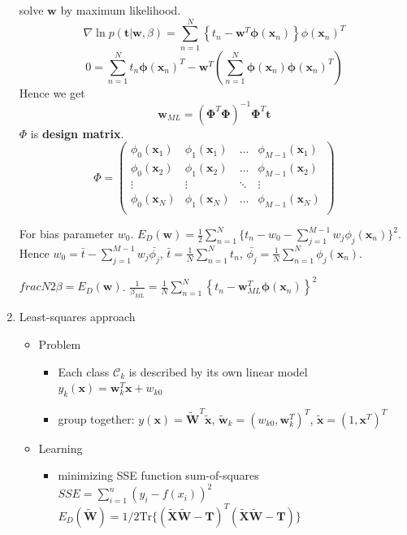 \documentclass[11pt]{article}
\newcommand{\bl}[1] {\boldsymbol{#1}}
\begin{document}
\begin{enumerate}
solve \(\bl{w}\) by maximum likelihood.
\begin{equation*}
\nabla\ln p(\bl{t}|\bl{w},\beta)=\displaystyle\sum_{n=1}^N
\left\{t_n-\bl{w}^T\bl{\phi}(\bl{x}_n)\right\}\phi(\bl{x}_n)^T
\end{equation*}
\begin{equation*}
0=\displaystyle\sum_{n=1}^N t_n\bl{\phi}(\bl{x}_n)^T-\bl{w}^T
(\displaystyle\sum_{n=1}^N\bl{\phi}(\bl{x}_n)\bl{\phi}(\bl{x}_n)^T)
\end{equation*}
Hence we get
\begin{equation*}
\bl{w}_{ML}=(\bl{\Phi}^T\bl{\Phi})^{-1}\bl{\Phi}^T\bl{t}
\end{equation*}
\(\Phi\) is \textbf{design matrix}.
\[
\Phi=\begin{pmatrix}
 \phi_0(\bl{x}_1) & \phi_1(\bl{x}_1) & \dots & \phi_{M-1}(\bl{x}_1) \\
 \phi_0(\bl{x}_2) & \phi_1(\bl{x}_2) & \dots & \phi_{M-1}(\bl{x}_2) \\
 \vdots & \vdots & \ddots & \vdots \\
 \phi_0(\bl{x}_N) & \phi_1(\bl{x}_N) & \dots & \phi_{M-1}(\bl{x}_N) \\
\end{pmatrix}
\]

For bias parameter \(w_0\).
\(E_D(\bl{w})=\frac{1}{2}\displaystyle\sum_{n=1}^N 
     \{t_n-w_0-\displaystyle\sum_{j=1}^{M-1}w_j\phi_j(\bl{x}_n)\}^2\). Hence
\(w_0=\bar{t}-\displaystyle\sum_{j=1}^{M-1}w_j\bar{\phi_j}\),
\(\bar{t}=\frac{1}{N}\displaystyle\sum_{n=1}^Nt_n\),
\(\bar{\phi_j}=\frac{1}{N}\displaystyle\sum_{n=1}^N\phi_j(\bl{x}_n)\).

\(frac{N}{2\beta}=E_D(\bl{w})\). \(\frac{1}{\beta_{ML}}=
     \frac{1}{N}\displaystyle\sum_{n=1}^N\left\{t_n-\bl{w}^T_{ML}
     \bl{\phi}(\bl{x}_n)\right\}^2\)
\item Least-squares approach
\label{sec:org3a414e4}
\begin{itemize}
\item Problem
\begin{itemize}
\item Each class \(\mathcal{C}_k\) is described by its own linear model 
\(y_k(\bl{x})=\bl{w}_k^T\bl{x}+w_{k0}\)
\item group together: \(y(\bl{x})=\widetilde{\bl{W}}^T\tilde{\bl{x}}\),
\(\tilde{\bl{w}}_k=(w_{k0},\bl{w}_k^T)^T\), \(\tilde{\bl{x}}=(1,\bl{x}^T)^T\)
\end{itemize}
\item Learning
\begin{itemize}
\item minimizing SSE function sum-of-squares
\(SSE=\displaystyle\sum_{i=1}^n(y_i-f(x_i))^2\)
\(E_D(\widetilde{\bl{W}})=1/2\text{Tr}\{(\bl{\widetilde{X}\widetilde{W}-T})^T 
         (\bl{\widetilde{X}\widetilde{W}-T})\}\)


\end{itemize}
\end{itemize}
\end{enumerate}
\end{document}
